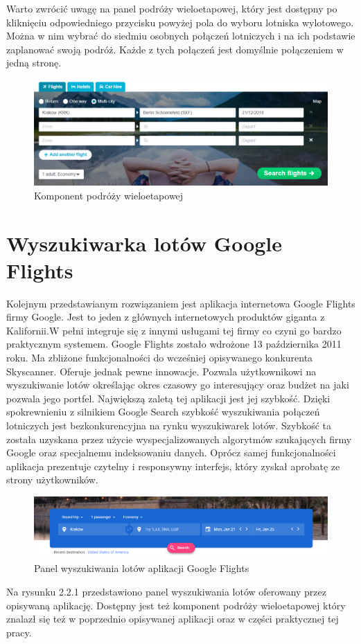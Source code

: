 \documentclass[12pt, twoside]{report}
\begin{document}
\newpage
Warto zwrócić uwagę na panel podróży wieloetapowej, który jest dostępny po kliknięciu  odpowiedniego przycisku powyżej pola do wyboru lotniska wylotowego. Można w nim wybrać do siedmiu osobnych połączeń lotniczych i na ich podstawie zaplanować swoją podróż. Każde z tych połączeń jest domyślnie połączeniem w jedną stronę. 
\begin{figure}[!ht]
\centering
\includegraphics[scale=0.50, keepaspectratio]{skyscanner_multi.png}
\caption{Komponent podróży wieloetapowej}
\label{fig:skyscanner_multi}
\end{figure}

\section{Wyszukiwarka lotów Google Flights}
Kolejnym przedstawianym rozwiązaniem jest aplikacja internetowa Google Flights firmy Google. Jest to jeden z głównych internetowych produktów giganta z Kalifornii.W pełni integruje się z innymi usługami tej firmy co czyni go bardzo praktycznym systemem. Google Flights zostało wdrożone 13 października 2011 roku. Ma zbliżone funkcjonalności do wcześniej opisywanego konkurenta Skyscanner. Oferuje jednak pewne innowacje. Pozwala użytkownikowi na wyszukiwanie lotów określając okres czasowy go interesujący oraz budżet na jaki pozwala jego portfel. Największą zaletą tej aplikacji jest jej szybkość. Dzięki spokrewnieniu z silnikiem Google Search szybkość wyszukiwania połączeń lotniczych jest bezkonkurencyjna na rynku wyszukiwarek lotów. Szybkość ta została uzyskana przez użycie wyspecjalizowanych algorytmów szukających firmy Google oraz specjalnemu indeksowaniu danych.
Oprócz samej funkcjonalności aplikacja prezentuje czytelny i responsywny interfejs, który zyskał aprobatę ze strony użytkowników.


\begin{figure}[!ht]
\centering
\includegraphics[scale=0.50, keepaspectratio]{google_flights_search_panel.png}
\caption{Panel wyszukiwania lotów aplikacji Google Flights}
\label{fig:google_flights_search_panel}
\end{figure}
Na rysunku 2.2.1 przedstawiono panel wyszukiwania lotów oferowany przez opisywaną aplikację. Dostępny jest też komponent podróży wieloetapowej który znalazł się też w poprzednio opisywanej aplikacji oraz w części praktycznej tej pracy.
\end{document}
